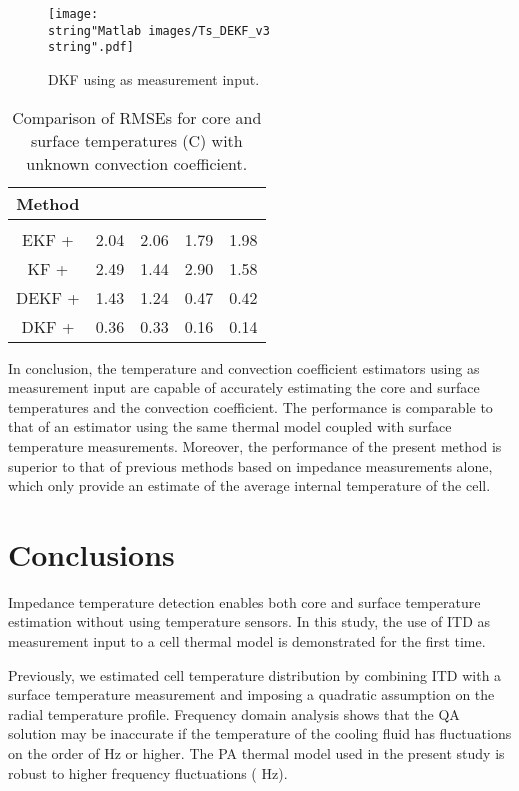 \documentclass[journal, english]{IEEEtran}
\providecommand{\tabularnewline}{\\}
\begin{document}
\begin{figure}[h]
\begin{centering}
\texttt{[image: \\string"Matlab images/Ts\_DEKF\_v3\\string".pdf]}
\par\end{centering}
\caption{DKF using  as measurement input.\label{fig:DEKF-using-T_surf}}
\end{figure}

\begin{table}[h]
\begin{centering}
\begin{tabular}{|c|c|c|c|c|}
\hline 
Method & \multicolumn{2}{c|}{} & \multicolumn{2}{c|}{}\tabularnewline
\hline 
 &  &  &  & \tabularnewline
\hline 
\hline 
EKF +  & 2.04 & 2.06 & 1.79 & 1.98\tabularnewline
\hline 
KF +  & 2.49 & 1.44 & 2.90 & 1.58\tabularnewline
\hline 
DEKF +  & 1.43 & 1.24 & 0.47 & 0.42\tabularnewline
\hline 
DKF +  & 0.36 & 0.33 & 0.16 & 0.14\tabularnewline
\hline 
\end{tabular}
\par\end{centering}
\begin{centering}
\caption{Comparison of RMSEs for core and surface temperatures (\degree C) with unknown
convection coefficient.\label{tab:Comparison-of-RMSEs}}
\par\end{centering}
\end{table}
In conclusion, the temperature and convection coefficient estimators
using  as measurement input are capable of accurately estimating
the core and surface temperatures and the convection coefficient.
The performance is comparable to that of an estimator using the same
thermal model coupled with surface temperature measurements.
Moreover, the performance of the present method is superior to that of previous methods based on impedance measurements alone, which only provide an estimate of the average internal temperature of the cell.

\section{Conclusions}
Impedance temperature detection enables both core and surface temperature estimation without using temperature sensors. In this study, the use of ITD as measurement input to a cell
thermal model is demonstrated for the first time.

Previously, we estimated cell temperature distribution by combining
ITD with a surface temperature measurement and imposing a quadratic
assumption on the radial temperature profile. Frequency domain analysis shows that the QA solution may
be inaccurate if the temperature of the cooling fluid has fluctuations on the order of  Hz or higher. The PA thermal
model used in the present study is robust to higher frequency fluctuations ( Hz).
\end{document}
